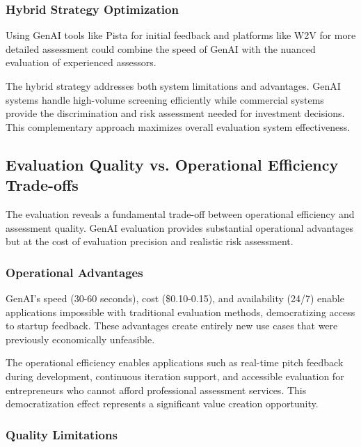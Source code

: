 \subsubsection{Hybrid Strategy Optimization}
\label{subsec:hybrid}

Using GenAI tools like Pista for initial feedback and platforms like W2V for more detailed assessment could combine the speed of GenAI with the nuanced evaluation of experienced assessors.

The hybrid strategy addresses both system limitations and advantages. GenAI systems handle high-volume screening efficiently while commercial systems provide the discrimination and risk assessment needed for investment decisions. This complementary approach maximizes overall evaluation system effectiveness.

\subsection{Evaluation Quality vs. Operational Efficiency Trade-offs}
\label{sec:tradeoffs}

The evaluation reveals a fundamental trade-off between operational efficiency and assessment quality. GenAI evaluation provides substantial operational advantages but at the cost of evaluation precision and realistic risk assessment.

\subsubsection{Operational Advantages}
\label{subsec:advantages}

GenAI's speed (30-60 seconds), cost (\$0.10-0.15), and availability (24/7) enable applications impossible with traditional evaluation methods, democratizing access to startup feedback. These advantages create entirely new use cases that were previously economically unfeasible.

The operational efficiency enables applications such as real-time pitch feedback during development, continuous iteration support, and accessible evaluation for entrepreneurs who cannot afford professional assessment services. This democratization effect represents a significant value creation opportunity.

\subsubsection{Quality Limitations}
\label{subsec:limitations}

